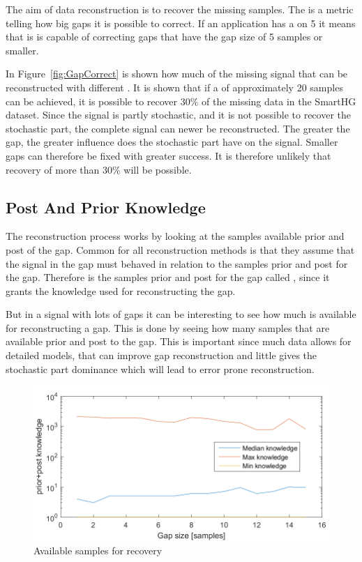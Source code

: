 The aim of data reconstruction is to recover the missing samples. The  is a metric telling how big gaps it is possible to correct. If an application has a  on 5 it means that is is capable of correcting gaps that have the gap size of 5 samples or smaller. 

In Figure~\ref{fig:GapCorrect} is shown how much of the missing signal that can be reconstructed with different . It is shown that if a  of approximately 20 samples can be achieved, it is possible to recover $30\%$ of the missing data in the SmartHG dataset. Since the signal is partly stochastic, and it is not possible to recover the stochastic part, the complete signal can newer be reconstructed. The greater the gap, the greater influence does the stochastic part have on the signal. Smaller gaps can therefore be fixed with greater success. It is therefore unlikely that recovery of more than $30\%$ will be possible. 

\subsection{Post And Prior Knowledge}
The reconstruction process works by looking at the samples available prior and post of the gap. Common for all reconstruction methods is that they assume that the signal in the gap must behaved in relation to the samples prior and post for the gap. Therefore is the samples prior and post for the gap called , since it grants the knowledge used for reconstructing the gap. 

But in a signal with lots of gaps it can be interesting to see how much  is available for reconstructing a gap. This is done by seeing how many samples that are available prior and post to the gap. This is important since much data allows for detailed models, that can improve gap reconstruction and little  gives the stochastic part dominance which will lead to error prone reconstruction. 

\begin{figure}[H]
\centering
\includegraphics[width=0.7\linewidth]{billeder/GapInfo2.png}\caption{Available samples for recovery}
\label{fig:PAF}
\end{figure}

